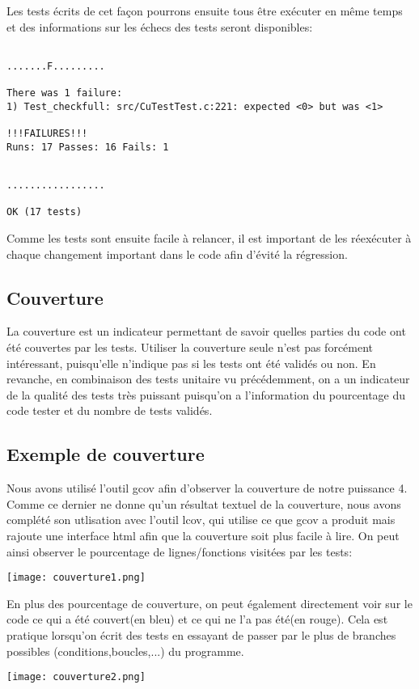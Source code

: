 \documentclass{report}
\begin{document}
Les tests écrits de cet façon pourrons ensuite tous être exécuter en même temps et des informations sur les échecs des tests seront disponibles:


\begin{lstlisting}

.......F.........

There was 1 failure:
1) Test_checkfull: src/CuTestTest.c:221: expected <0> but was <1>

!!!FAILURES!!!
Runs: 17 Passes: 16 Fails: 1

\end{lstlisting}
\begin{lstlisting}

.................

OK (17 tests)
\end{lstlisting}

Comme les tests sont ensuite facile à relancer, il est important de les réexécuter à chaque changement important dans le code afin d'évité la régression.

\subsection{Couverture}
La couverture est un indicateur permettant de savoir quelles parties du code ont été couvertes par les tests. Utiliser la couverture seule n'est pas forcément intéressant, puisqu'elle n'indique pas si les tests ont été validés ou non. En revanche, en combinaison des tests unitaire vu précédemment, on a un indicateur de la qualité des tests très puissant puisqu'on a l'information du pourcentage du code tester et du nombre de tests validés.
\subsection{Exemple de couverture}
Nous avons utilisé l'outil gcov afin d'observer la couverture de notre puissance 4. Comme ce dernier ne donne qu'un résultat textuel de la couverture, nous avons complété son utlisation avec l'outil lcov, qui utilise ce que gcov a produit mais rajoute une interface html afin que la couverture soit plus facile à lire. On peut ainsi observer le pourcentage de lignes/fonctions visitées par les tests:

\begin{center}
  \texttt{[image: couverture1.png]}
\end{center}

En plus des pourcentage de couverture, on peut également directement voir sur le code ce qui a été couvert(en bleu) et ce qui ne l'a pas été(en rouge). Cela est pratique lorsqu'on écrit des tests en essayant de passer par le plus de branches possibles (conditions,boucles,...) du programme.

\begin{center}
  \texttt{[image: couverture2.png]}
\end{center}
\end{document}
